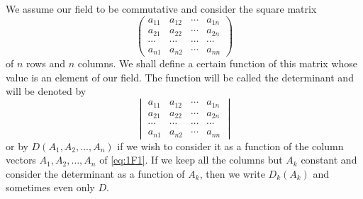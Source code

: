 \documentclass[10pt,leqno,a5paper]{book}
\theoremstyle{definition}
\begin{document}
We assume our field to be commutative and consider the square matrix
\begin{equation}
\label{eq:1F1}
\begin{pmatrix}
a_{11} & a_{12} & \cdots & a_{1n}
\\
a_{21} & a_{22} & \cdots & a_{2n}
\\
\cdots & \cdots & \cdots & \cdots
\\
a_{n1} & a_{n2} & \cdots & a_{nn}
\end{pmatrix}
\end{equation}
of $n$ rows and $n$ columns.
We shall define a certain function of this matrix whose value is an element of our field.
The function will be called the determinant and will be denoted by
\begin{equation}
\label{eq:1F2}
\begin{vmatrix}
a_{11} & a_{12} & \cdots & a_{1n}
\\
a_{21} & a_{22} & \cdots & a_{2n}
\\
\cdots & \cdots & \cdots & \cdots
\\
a_{n1} & a_{n2} & \cdots & a_{nn}
\end{vmatrix}
\end{equation}
or by $D(A_1, A_2, \ldots, A_n)$ if we wish to consider it as a function of the column vectors $A_1, A_2, \ldots, A_n$ of \eqref{eq:1F1}.
If we keep all the columns but $A_k$ constant and consider the determinant as a function of $A_k$, then we write $D_k(A_k)$ and sometimes even only $D$.
\end{document}
